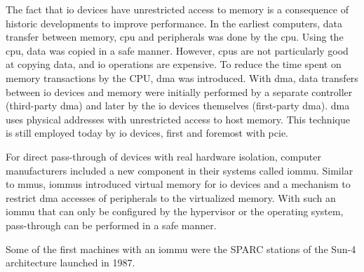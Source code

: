 The fact that \ac{io} devices have unrestricted access to memory is a
consequence of historic developments to improve performance. In the earliest
computers, data transfer between memory, \acs{cpu} and peripherals was done by
the \ac{cpu}. Using the \ac{cpu}, data was copied in a safe manner. However,
\acp{cpu} are not particularly good at copying data, and \ac{io} operations are
expensive. To reduce the time spent on memory transactions by the CPU, \ac{dma}
was introduced. With \ac{dma}, data transfers between \ac{io} devices and memory
were initially performed by a separate controller (third-party \ac{dma}) and
later by the \ac{io} devices themselves (first-party \ac{dma}). \ac{dma} uses
physical addresses with unrestricted access to host memory. This technique is
still employed today by \ac{io} devices, first and foremost with \ac{pcie}.

For direct pass-through of devices with real hardware isolation, computer
manufacturers included a new component in their systems called \acf{iommu}.
Similar to \acp{mmu}, \acp{iommu} introduced virtual memory for \ac{io} devices
and a mechanism to restrict \ac{dma} accesses of peripherals to the virtualized
memory. With such an \ac{iommu} that can only be configured by the hypervisor
or the operating system, pass-through can be performed in a safe manner.

Some of the first machines with an \ac{iommu} were the SPARC stations of the
Sun-4 architecture launched in 1987.

